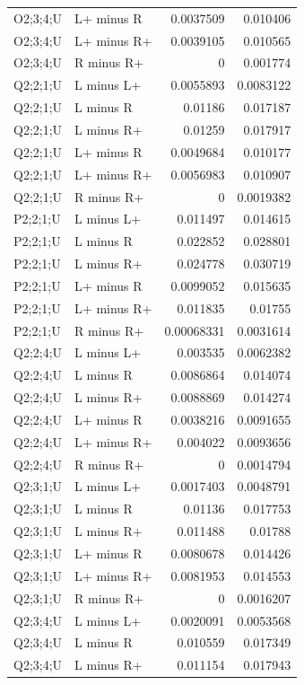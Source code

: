 {\begin{longtable}{@{}llrr@{}}
O2;3;4;U & L+ minus R & 0.0037509 & 0.010406 \\
O2;3;4;U & L+ minus R+ & 0.0039105 & 0.010565 \\
O2;3;4;U & R minus R+ & 0 & 0.001774 \\
Q2;2;1;U & L minus L+ & 0.0055893 & 0.0083122 \\
Q2;2;1;U & L minus R & 0.01186 & 0.017187 \\
Q2;2;1;U & L minus R+ & 0.01259 & 0.017917 \\
Q2;2;1;U & L+ minus R & 0.0049684 & 0.010177 \\
Q2;2;1;U & L+ minus R+ & 0.0056983 & 0.010907 \\
Q2;2;1;U & R minus R+ & 0 & 0.0019382 \\
P2;2;1;U & L minus L+ & 0.011497 & 0.014615 \\
P2;2;1;U & L minus R & 0.022852 & 0.028801 \\
P2;2;1;U & L minus R+ & 0.024778 & 0.030719 \\
P2;2;1;U & L+ minus R & 0.0099052 & 0.015635 \\
P2;2;1;U & L+ minus R+ & 0.011835 & 0.01755 \\
P2;2;1;U & R minus R+ & 0.00068331 & 0.0031614 \\
Q2;2;4;U & L minus L+ & 0.003535 & 0.0062382 \\
Q2;2;4;U & L minus R & 0.0086864 & 0.014074 \\
Q2;2;4;U & L minus R+ & 0.0088869 & 0.014274 \\
Q2;2;4;U & L+ minus R & 0.0038216 & 0.0091655 \\
Q2;2;4;U & L+ minus R+ & 0.004022 & 0.0093656 \\
Q2;2;4;U & R minus R+ & 0 & 0.0014794 \\
Q2;3;1;U & L minus L+ & 0.0017403 & 0.0048791 \\
Q2;3;1;U & L minus R & 0.01136 & 0.017753 \\
Q2;3;1;U & L minus R+ & 0.011488 & 0.01788 \\
Q2;3;1;U & L+ minus R & 0.0080678 & 0.014426 \\
Q2;3;1;U & L+ minus R+ & 0.0081953 & 0.014553 \\
Q2;3;1;U & R minus R+ & 0 & 0.0016207 \\
Q2;3;4;U & L minus L+ & 0.0020091 & 0.0053568 \\
Q2;3;4;U & L minus R & 0.010559 & 0.017349 \\
Q2;3;4;U & L minus R+ & 0.011154 & 0.017943 \\

\end{longtable}}
